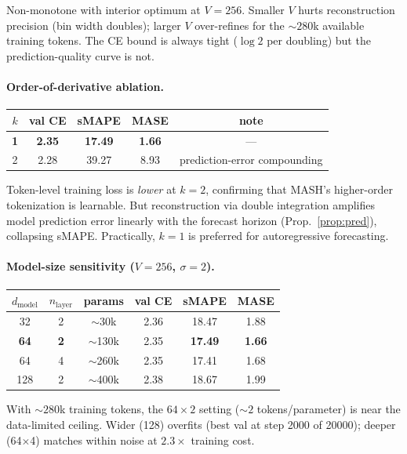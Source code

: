 \documentclass[11pt]{article}
\theoremstyle{remark}
\begin{document}
Non-monotone with interior optimum at $V = 256$. Smaller $V$ hurts
reconstruction precision (bin width doubles); larger $V$ over-refines
for the $\sim 280$k available training tokens. The CE bound is always
tight ($\log 2$ per doubling) but the prediction-quality curve is not.

\paragraph{Order-of-derivative ablation.}
\begin{center}
\begin{tabular}{ccccc}
\toprule
$k$ & val CE & sMAPE & MASE & note \\
\midrule
\textbf{1} & \textbf{2.35} & \textbf{17.49} & \textbf{1.66} & --- \\
2 & 2.28 & 39.27 & 8.93 & prediction-error compounding \\
\bottomrule
\end{tabular}
\end{center}

Token-level training loss is \emph{lower} at $k=2$, confirming that
MASH's higher-order tokenization is learnable. But reconstruction via
double integration amplifies model prediction error linearly with the
forecast horizon (Prop.~\ref{prop:pred}), collapsing sMAPE.
Practically, $k = 1$ is preferred for autoregressive forecasting.

\paragraph{Model-size sensitivity ($V = 256$, $\sigma = 2$).}
\begin{center}
\begin{tabular}{cccccc}
\toprule
$d_{\text{model}}$ & $n_{\text{layer}}$ & params & val CE & sMAPE & MASE \\
\midrule
32 & 2 & $\sim$30k  & 2.36 & 18.47 & 1.88 \\
\textbf{64} & \textbf{2} & $\sim$130k & 2.35 & \textbf{17.49} & \textbf{1.66} \\
64 & 4 & $\sim$260k & 2.35 & 17.41 & 1.68 \\
128 & 2 & $\sim$400k & 2.38 & 18.67 & 1.99 \\
\bottomrule
\end{tabular}
\end{center}

With $\sim 280$k training tokens, the $64 \times 2$ setting
($\sim 2$ tokens/parameter) is near the data-limited ceiling. Wider
(128) overfits (best val at step 2000 of 20000); deeper (64$\times$4)
matches within noise at $2.3\times$ training cost.
\end{document}
